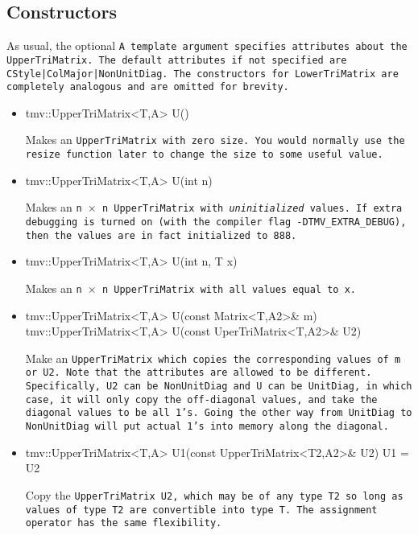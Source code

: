 \subsection{Constructors}
\label{TriMatrix_Constructors}

As usual, the optional \tt{A} template argument specifies attributes about
the \tt{UpperTriMatrix}.  The default attributes if not specified are
\tt{CStyle|ColMajor|NonUnitDiag}.  The constructors for \tt{LowerTriMatrix} are 
completely analogous and are omitted for brevity.

\begin{itemize}

\item
\begin{tmvcode}
tmv::UpperTriMatrix<T,A> U()
\end{tmvcode}
Makes an \tt{UpperTriMatrix} with zero size.  You would normally use the \tt{resize} function later to
change the size to some useful value.

\item 
\begin{tmvcode}
tmv::UpperTriMatrix<T,A> U(int n)
\end{tmvcode}
Makes an \tt{n} $\times$ \tt{n} \tt{UpperTriMatrix} with {\em uninitialized} values.
If extra debugging is turned on (with the compiler flag \tt{-DTMV\_EXTRA\_DEBUG}), then the values are in fact initialized to 888.  

\item
\begin{tmvcode}
tmv::UpperTriMatrix<T,A> U(int n, T x)
\end{tmvcode}
Makes an \tt{n} $\times$ \tt{n} \tt{UpperTriMatrix} with all values equal to \tt{x}.

\item 
\begin{tmvcode}
tmv::UpperTriMatrix<T,A> U(const Matrix<T,A2>& m)
tmv::UpperTriMatrix<T,A> U(const UperTriMatrix<T,A2>& U2)
\end{tmvcode}
Make an \tt{UpperTriMatrix} which copies the corresponding values of
\tt{m} or \tt{U2}.  Note that the attributes are allowed to be different.
Specifically, \tt{U2} can be \tt{NonUnitDiag} and \tt{U} can be \tt{UnitDiag},
in which case, it will only copy the off-diagonal values, and take
the diagonal values to be all 1's.  Going the other way from \tt{UnitDiag}
to \tt{NonUnitDiag} will put actual 1's into memory along the diagonal.

\item
\begin{tmvcode}
tmv::UpperTriMatrix<T,A> U1(const UpperTriMatrix<T2,A2>& U2)
U1 = U2
\end{tmvcode}
Copy the \tt{UpperTriMatrix U2}, which may be of any type \tt{T2} so long
as values of type \tt{T2} are convertible into type \tt{T}.
The assignment operator has the same flexibility.


\end{itemize}
